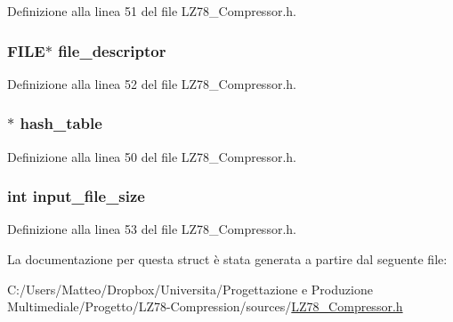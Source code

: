 Definizione alla linea 51 del file L\-Z78\-\_\-\-Compressor.\-h.

\hypertarget{struct__lz78__compressor__t_a52a785c913c28c61f56c4aa10e3a1641}{
\subsubsection[{file\-\_\-descriptor}]{\setlength{\rightskip}{0pt plus 5cm}F\-I\-L\-E$\ast$ file\-\_\-descriptor}}\label{struct__lz78__compressor__t_a52a785c913c28c61f56c4aa10e3a1641}


Definizione alla linea 52 del file L\-Z78\-\_\-\-Compressor.\-h.

\hypertarget{struct__lz78__compressor__t_ab945a6bd56aa0252f14aa71761ab0653}{
\subsubsection[{hash\-\_\-table}]{$\ast$ hash\-\_\-table}}\label{struct__lz78__compressor__t_ab945a6bd56aa0252f14aa71761ab0653}


Definizione alla linea 50 del file L\-Z78\-\_\-\-Compressor.\-h.

\hypertarget{struct__lz78__compressor__t_a9dcb05a89ce187b840474a162322568a}{
\subsubsection[{input\-\_\-file\-\_\-size}]{\setlength{\rightskip}{0pt plus 5cm}int input\-\_\-file\-\_\-size}}\label{struct__lz78__compressor__t_a9dcb05a89ce187b840474a162322568a}


Definizione alla linea 53 del file L\-Z78\-\_\-\-Compressor.\-h.



La documentazione per questa struct è stata generata a partire dal seguente file\-:\begin{DoxyCompactItemize}
\item 
C\-:/\-Users/\-Matteo/\-Dropbox/\-Universita/\-Progettazione e Produzione Multimediale/\-Progetto/\-L\-Z78-\/\-Compression/sources/\hyperlink{_l_z78___compressor_8h}{L\-Z78\-\_\-\-Compressor.\-h}\end{DoxyCompactItemize}
